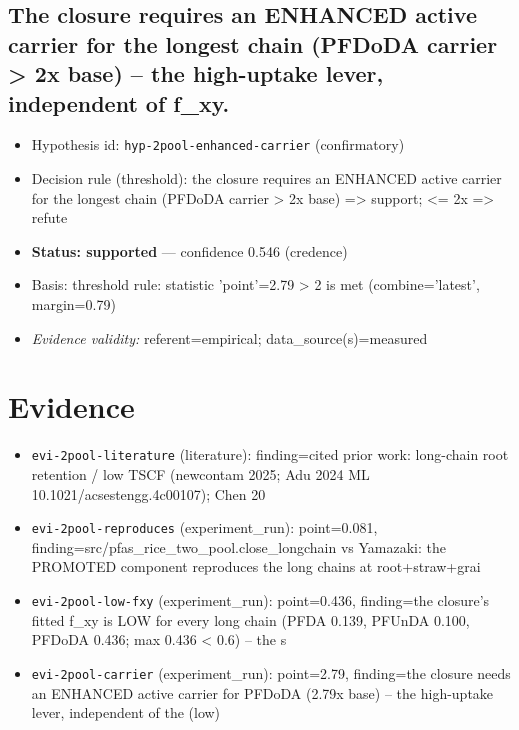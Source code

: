 \documentclass{article}
\begin{document}
\subsection{The closure requires an ENHANCED active carrier for the longest chain (PFDoDA carrier > 2x base) -- the high-uptake lever, independent of f\_xy.}
\begin{itemize}
  \item Hypothesis id: \texttt{hyp-2pool-enhanced-carrier} (confirmatory)
  \item Decision rule (threshold): the closure requires an ENHANCED active carrier for the longest chain (PFDoDA carrier > 2x base) => support; <= 2x => refute
  \item \textbf{Status: supported} --- confidence 0.546 (credence)
  \item Basis: threshold rule: statistic 'point'=2.79 > 2 is met (combine='latest', margin=0.79)
  \item \textit{Evidence validity:} referent=empirical; data\_source(s)=measured
\end{itemize}

\section{Evidence}
\begin{itemize}
  \item \texttt{evi-2pool-literature} (literature): finding=cited prior work: long-chain root retention / low TSCF (newcontam 2025; Adu 2024 ML 10.1021/acsestengg.4c00107); Chen 20
  \item \texttt{evi-2pool-reproduces} (experiment\_run): point=0.081, finding=src/pfas\_rice\_two\_pool.close\_longchain vs Yamazaki: the PROMOTED component reproduces the long chains at root+straw+grai
  \item \texttt{evi-2pool-low-fxy} (experiment\_run): point=0.436, finding=the closure's fitted f\_xy is LOW for every long chain (PFDA 0.139, PFUnDA 0.100, PFDoDA 0.436; max 0.436 < 0.6) -- the s
  \item \texttt{evi-2pool-carrier} (experiment\_run): point=2.79, finding=the closure needs an ENHANCED active carrier for PFDoDA (2.79x base) -- the high-uptake lever, independent of the (low) 
\end{itemize}
\end{document}
